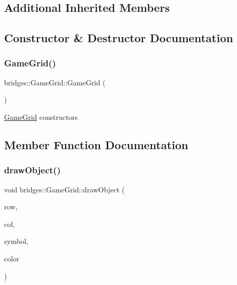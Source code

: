 \subsection*{Additional Inherited Members}


\subsection{Constructor \& Destructor Documentation}
\mbox{\label{classbridges_1_1_game_grid_ac3e87a3086b5a61b57e2ace30547ed06}} 
\subsubsection{\texorpdfstring{GameGrid()}{GameGrid()}}
{\footnotesize\ttfamily bridges\+::\+Game\+Grid\+::\+Game\+Grid (\begin{DoxyParamCaption}{ }\end{DoxyParamCaption})\hspace{0.3cm}{\ttfamily [inline]}}

\mbox{\hyperlink{classbridges_1_1_game_grid}{Game\+Grid}} constructors 

\subsection{Member Function Documentation}
\mbox{\label{classbridges_1_1_game_grid_a6cd5a11ca69e4753760741e27b08d008}} 
\subsubsection{\texorpdfstring{drawObject()}{drawObject()}}
{\footnotesize\ttfamily void bridges\+::\+Game\+Grid\+::draw\+Object (\begin{DoxyParamCaption}\item[{int}]{row,  }\item[{int}]{col,  }\item[{\mbox{\hyperlink{namespacebridges_acfb0a4f7877d8f63de3e6862004c50ed}{Named\+Symbol}}}]{symbol,  }\item[{\mbox{\hyperlink{namespacebridges_ad811207d8898a7fd6b72a74725e68357}{Named\+Color}}}]{color }\end{DoxyParamCaption})\hspace{0.3cm}{\ttfamily [inline]}}

